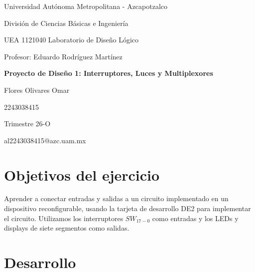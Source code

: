 \documentclass[12pt]{report}
\begin{document}
\setlength{\headheight}{15pt}

\begin{titlepage}
    \centering
    {\Large Universidad Autónoma Metropolitana - Azcapotzalco \par}
    {\large División de Ciencias Básicas e Ingeniería \par}
    \vspace{1cm}
    {\large UEA 1121040 Laboratorio de Diseño Lógico \par}
    \vspace{0.5cm}
    {\large Profesor: Eduardo Rodríguez Martínez \par}
    \vspace{2cm}
    {\Large \textbf{Proyecto de Diseño 1: Interruptores, Luces y Multiplexores} \par}
    \vspace{2cm}
    {\large Flores Olivares Omar \par}
    {\large 2243038415 \par}
    \vspace{0.5cm}
    {\large Trimestre 26-O \par}
    \vspace{0.5cm}
    {\large al2243038415@azc.uam.mx \par}
    \vfill
\end{titlepage}


\section*{Objetivos del ejercicio}
Aprender a conectar entradas y salidas a un circuito implementado en un dispositivo reconfigurable, usando la tarjeta de desarrollo DE2 para implementar el circuito. Utilizamos los interruptores $SW_{17-0}$ como entradas y los LEDs y displays de siete segmentos como salidas.

\section*{Desarrollo}%
\end{document}
